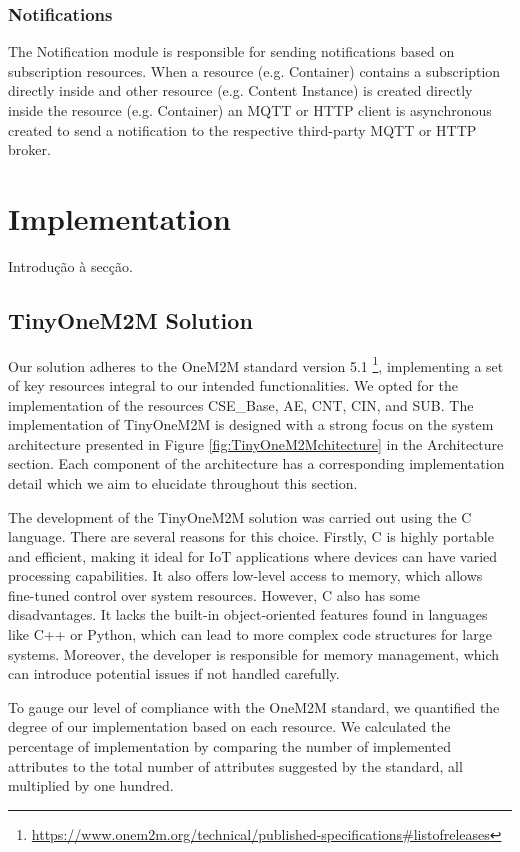 \documentclass[a4paper,fleqn]{cas-dc}
\begin{document}
\subsubsection{Notifications}

The Notification module is responsible for sending notifications based on subscription resources. When a resource (e.g. Container) contains a subscription directly inside and other resource (e.g. Content Instance) is created directly inside the resource (e.g. Container) an MQTT or HTTP client is asynchronous created to send a notification to the respective third-party MQTT or HTTP broker.

\section{Implementation}

Introdução à secção.

\subsection{TinyOneM2M Solution} \label{sec:tinyonem2msolution}

Our solution adheres to the OneM2M standard version 5.1 \footnote{\url{https://www.onem2m.org/technical/published-specifications\#listofreleases}}, implementing a set of key resources integral to our intended functionalities. We opted for the implementation of the resources CSE\_Base, AE, CNT, CIN, and SUB. The implementation of TinyOneM2M is designed with a strong focus on the system architecture presented in Figure \ref{fig:TinyOneM2Mchitecture} in the Architecture section. Each component of the architecture has a corresponding implementation detail which we aim to elucidate throughout this section.

The development of the TinyOneM2M solution was carried out using the C language. There are several reasons for this choice. Firstly, C is highly portable and efficient, making it ideal for IoT applications where devices can have varied processing capabilities. It also offers low-level access to memory, which allows fine-tuned control over system resources. However, C also has some disadvantages. It lacks the built-in object-oriented features found in languages like C++ or Python, which can lead to more complex code structures for large systems. Moreover, the developer is responsible for memory management, which can introduce potential issues if not handled carefully.

To gauge our level of compliance with the OneM2M standard, we quantified the degree of our implementation based on each resource. We calculated the percentage of implementation by comparing the number of implemented attributes to the total number of attributes suggested by the standard, all multiplied by one hundred.
\end{document}
